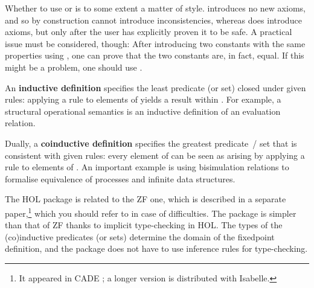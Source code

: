 \begin{isabellebody}
\begin{isamarkuptext}
  Whether to use \hyperlink{command.HOL.specification}{\mbox{}} or \hyperlink{command.HOL.ax-specification}{\mbox{}} is to some extent a matter of style.  \hyperlink{command.HOL.specification}{\mbox{}} introduces no new axioms, and so by
  construction cannot introduce inconsistencies, whereas \hyperlink{command.HOL.ax-specification}{\mbox{}} does introduce axioms, but only after the
  user has explicitly proven it to be safe.  A practical issue must be
  considered, though: After introducing two constants with the same
  properties using \hyperlink{command.HOL.specification}{\mbox{}}, one can prove
  that the two constants are, in fact, equal.  If this might be a
  problem, one should use \hyperlink{command.HOL.ax-specification}{\mbox{}}.%
\end{isamarkuptext}%
\isamarkuptrue%
%
\isamarkuptrue%
%
\begin{isamarkuptext}%
An \textbf{inductive definition} specifies the least predicate (or
  set)  closed under given rules: applying a rule to elements
  of  yields a result within .  For example, a
  structural operational semantics is an inductive definition of an
  evaluation relation.

  Dually, a \textbf{coinductive definition} specifies the greatest
  predicate~/ set  that is consistent with given rules: every
  element of  can be seen as arising by applying a rule to
  elements of .  An important example is using bisimulation
  relations to formalise equivalence of processes and infinite data
  structures.

  \medskip The HOL package is related to the ZF one, which is
  described in a separate paper,\footnote{It appeared in CADE
  \cite{paulson-CADE}; a longer version is distributed with Isabelle.}
  which you should refer to in case of difficulties.  The package is
  simpler than that of ZF thanks to implicit type-checking in HOL.
  The types of the (co)inductive predicates (or sets) determine the
  domain of the fixedpoint definition, and the package does not have
  to use inference rules for type-checking.


\end{isamarkuptext}
\end{isabellebody}
